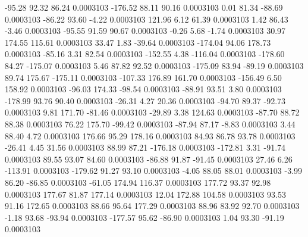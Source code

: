       -95.28       92.32       86.24     0.0003103
     -176.52       88.11       90.16     0.0003103
        0.01       81.34      -88.69     0.0003103
      -86.22       93.60       -4.22     0.0003103
      121.96        6.12       61.39     0.0003103
        1.42       86.43       -3.46     0.0003103
      -95.55       91.59       90.67     0.0003103
       -0.26        5.68       -1.74     0.0003103
       30.97      174.55      115.61     0.0003103
       33.47        1.83      -39.64     0.0003103
     -174.04       94.06      178.73     0.0003103
      -85.16        3.31       82.54     0.0003103
     -152.55        4.38     -116.04     0.0003103
     -178.60       84.27     -175.07     0.0003103
        5.46       87.82       92.52     0.0003103
     -175.09       83.94      -89.19     0.0003103
       89.74      175.67     -175.11     0.0003103
     -107.33      176.89      161.70     0.0003103
     -156.49        6.50      158.92     0.0003103
      -96.03      174.33      -98.54     0.0003103
      -88.91       93.51        3.80     0.0003103
     -178.99       93.76       90.40     0.0003103
      -26.31        4.27       20.36     0.0003103
      -94.70       89.37      -92.73     0.0003103
        9.81      171.70      -81.46     0.0003103
      -29.89        3.38      124.63     0.0003103
      -87.70       88.72       88.38     0.0003103
       76.22      175.70      -99.42     0.0003103
      -87.94       87.17       -8.83     0.0003103
        3.44       88.40        4.72     0.0003103
      176.66       95.29      178.16     0.0003103
       84.93       86.78       93.78     0.0003103
      -26.41        4.45       31.56     0.0003103
       88.99       87.21     -176.18     0.0003103
     -172.81        3.31      -91.74     0.0003103
       89.55       93.07       84.60     0.0003103
      -86.88       91.87      -91.45     0.0003103
       27.46        6.26     -113.91     0.0003103
     -179.62       91.27       93.10     0.0003103
       -4.05       88.05       88.01     0.0003103
       -3.99       86.20      -86.85     0.0003103
      -61.05      174.94      116.37     0.0003103
      177.72       93.37       92.98     0.0003103
      177.67       81.87      177.14     0.0003103
       12.04      172.88      104.58     0.0003103
       93.53       91.16      172.65     0.0003103
       88.66       95.64      177.29     0.0003103
       88.96       83.92       92.70     0.0003103
       -1.18       93.68      -93.94     0.0003103
     -177.57       95.62      -86.90     0.0003103
        1.04       93.30      -91.19     0.0003103
